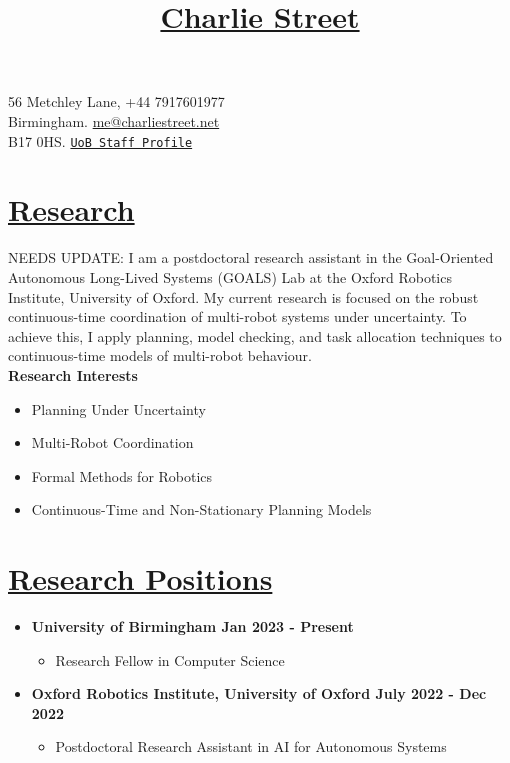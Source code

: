 \documentclass[11pt]{article}
\title{\vspace{-70pt}\Huge\underline{Charlie Street}}
\date{}
\begin{document}
\maketitle
\vspace*{-60pt}

\begin{flushleft}
\noindent
\large 56 Metchley Lane,
\hfill 
\large +44 7917601977 \\
\large Birmingham. 
\hfill
\large
\large \href{mailto:me@charliestreet.net}{\url{me@charliestreet.net}} \\
\large B17 0HS.
\hfill
\large
\href{https://www.birmingham.ac.uk/staff/profiles/computer-science/research-fellow/street-charlie.aspx}{\texttt{UoB Staff Profile}} \\
\end{flushleft}
	
\section*{\uline{Research}}	

NEEDS UPDATE:
I am a postdoctoral research assistant in the Goal-Oriented Autonomous Long-Lived Systems (GOALS) Lab at the Oxford Robotics Institute, University of Oxford.
%
My current research is focused on the robust continuous-time coordination of multi-robot systems under uncertainty.
%
To achieve this, I apply planning, model checking, and task allocation techniques to continuous-time models of multi-robot behaviour.\\

\noindent \textbf{Research Interests}
\begin{itemize}
    \item Planning Under Uncertainty
    \item Multi-Robot Coordination
    \item Formal Methods for Robotics 
    \item Continuous-Time and Non-Stationary Planning Models
\end{itemize}

\section*{\uline{Research Positions}}
\begin{itemize}
\item \textbf{University of Birmingham \hfill Jan 2023 - Present} 
\begin{itemize}
    \item Research Fellow in Computer Science
\end{itemize}
\item \textbf{Oxford Robotics Institute, University of Oxford \hfill July 2022 - Dec 2022} 
\begin{itemize}
    \item Postdoctoral Research Assistant in AI for Autonomous Systems
\end{itemize}
\end{itemize}
	
\end{document}
